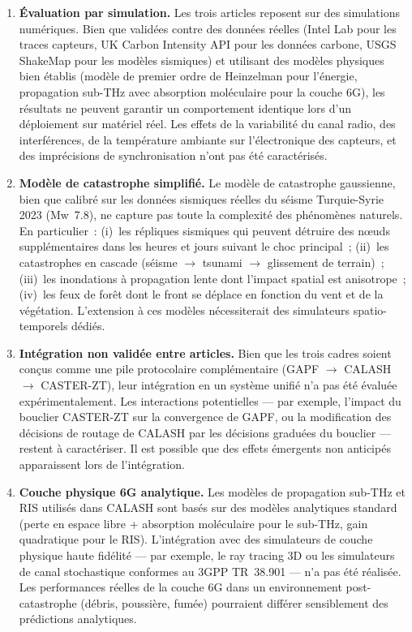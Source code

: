 \begin{enumerate}
    \item \textbf{Évaluation par simulation.} Les trois articles reposent sur des simulations numériques. Bien que validées contre des données réelles (Intel Lab pour les traces capteurs, UK Carbon Intensity API pour les données carbone, USGS ShakeMap pour les modèles sismiques) et utilisant des modèles physiques bien établis (modèle de premier ordre de Heinzelman \cite{heinzelman2000leach} pour l'énergie, propagation sub-THz avec absorption moléculaire pour la couche 6G), les résultats ne peuvent garantir un comportement identique lors d'un déploiement sur matériel réel. Les effets de la variabilité du canal radio, des interférences, de la température ambiante sur l'électronique des capteurs, et des imprécisions de synchronisation n'ont pas été caractérisés.

    \item \textbf{Modèle de catastrophe simplifié.} Le modèle de catastrophe gaussienne, bien que calibré sur les données sismiques réelles du séisme Turquie-Syrie 2023 (Mw~7.8), ne capture pas toute la complexité des phénomènes naturels. En particulier~: (i)~les répliques sismiques qui peuvent détruire des n\oe{}uds supplémentaires dans les heures et jours suivant le choc principal~; (ii)~les catastrophes en cascade (séisme $\to$ tsunami $\to$ glissement de terrain)~; (iii)~les inondations à propagation lente dont l'impact spatial est anisotrope~; (iv)~les feux de forêt dont le front se déplace en fonction du vent et de la végétation. L'extension à ces modèles nécessiterait des simulateurs spatio-temporels dédiés.

    \item \textbf{Intégration non validée entre articles.} Bien que les trois cadres soient conçus comme une pile protocolaire complémentaire (GAPF $\to$ CALASH $\to$ CASTER-ZT), leur intégration en un système unifié n'a pas été évaluée expérimentalement. Les interactions potentielles --- par exemple, l'impact du bouclier CASTER-ZT sur la convergence de GAPF, ou la modification des décisions de routage de CALASH par les décisions graduées du bouclier --- restent à caractériser. Il est possible que des effets émergents non anticipés apparaissent lors de l'intégration.

    \item \textbf{Couche physique 6G analytique.} Les modèles de propagation sub-THz et RIS utilisés dans CALASH sont basés sur des modèles analytiques standard (perte en espace libre + absorption moléculaire pour le sub-THz, gain quadratique pour le RIS). L'intégration avec des simulateurs de couche physique haute fidélité --- par exemple, le ray tracing 3D ou les simulateurs de canal stochastique conformes au 3GPP TR~38.901 --- n'a pas été réalisée. Les performances réelles de la couche 6G dans un environnement post-catastrophe (débris, poussière, fumée) pourraient différer sensiblement des prédictions analytiques.


\end{enumerate}
